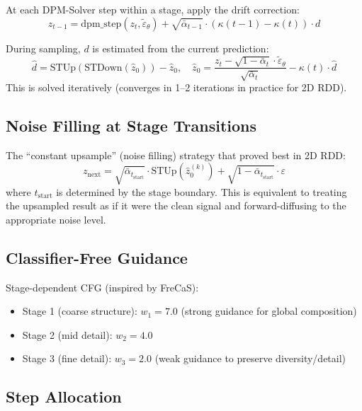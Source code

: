 \documentclass[11pt,a4paper]{article}
\begin{document}
At each DPM-Solver step within a stage, apply the drift correction:
\begin{equation}
z_{t-1} = \text{dpm\_step}(z_t, \tilde\varepsilon_\theta) + \sqrt{\bar\alpha_{t-1}} \cdot (\kappa(t-1) - \kappa(t)) \cdot d
\end{equation}

During sampling, $d$ is estimated from the current prediction:
\begin{equation}
\hat{d} = \text{STUp}(\text{STDown}(\hat{z}_0)) - \hat{z}_0, \quad \hat{z}_0 = \frac{z_t - \sqrt{1-\bar\alpha_t} \cdot \tilde\varepsilon_\theta}{\sqrt{\bar\alpha_t}} - \kappa(t) \cdot \hat{d}
\end{equation}
This is solved iteratively (converges in 1--2 iterations in practice for 2D RDD).

\subsection{Noise Filling at Stage Transitions}

The ``constant upsample'' (noise filling) strategy that proved best in 2D RDD:
\begin{equation}
z_\text{next} = \sqrt{\bar\alpha_{t_\text{start}}} \cdot \text{STUp}(\hat{z}_0^{(k)}) + \sqrt{1-\bar\alpha_{t_\text{start}}} \cdot \varepsilon
\end{equation}
where $t_\text{start}$ is determined by the stage boundary. This is equivalent to treating the upsampled result as if it were the clean signal and forward-diffusing to the appropriate noise level.

\subsection{Classifier-Free Guidance}

Stage-dependent CFG (inspired by FreCaS):
\begin{itemize}[nosep]
\item Stage 1 (coarse structure): $w_1 = 7.0$ (strong guidance for global composition)
\item Stage 2 (mid detail): $w_2 = 4.0$
\item Stage 3 (fine detail): $w_3 = 2.0$ (weak guidance to preserve diversity/detail)
\end{itemize}

\subsection{Step Allocation}
\end{document}
